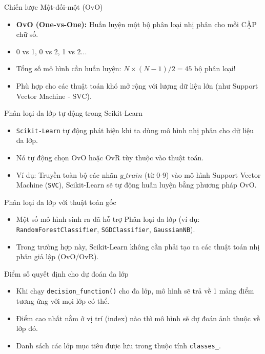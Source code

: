 \documentclass[aspectratio=169]{beamer}
\begin{document}
\begin{frame}{Chiến lược Một-đối-một (OvO)}
\begin{itemize}
    \item \textbf{OvO (One-vs-One):} Huấn luyện một bộ phân loại nhị phân cho mỗi CẶP chữ số.
    \item 0 vs 1, 0 vs 2, 1 vs 2...
    \item Tổng số mô hình cần huấn luyện: $N \times (N-1) / 2 = 45$ bộ phân loại!
    \item Phù hợp cho các thuật toán khó mở rộng với lượng dữ liệu lớn (như Support Vector Machine - SVC).
\end{itemize}
\end{frame}

\begin{frame}{Phân loại đa lớp tự động trong Scikit-Learn}
\begin{itemize}
    \item \texttt{Scikit-Learn} tự động phát hiện khi ta dùng mô hình nhị phân cho dữ liệu đa lớp.
    \item Nó tự động chọn OvO hoặc OvR tùy thuộc vào thuật toán.
    \item Ví dụ: Truyền toàn bộ các nhãn $y\_train$ (từ 0-9) vào mô hình Support Vector Machine (\texttt{SVC}), Scikit-Learn sẽ tự động huấn luyện bằng phương pháp OvO.
\end{itemize}
\end{frame}

\begin{frame}{Phân loại đa lớp với thuật toán gốc}
\begin{itemize}
    \item Một số mô hình sinh ra đã hỗ trợ Phân loại đa lớp (ví dụ: \texttt{RandomForestClassifier}, \texttt{SGDClassifier}, \texttt{GaussianNB}).
    \item Trong trường hợp này, Scikit-Learn không cần phải tạo ra các thuật toán nhị phân giả lập (OvO/OvR).
\end{itemize}
\end{frame}

\begin{frame}{Điểm số quyết định cho dự đoán đa lớp}
\begin{itemize}
    \item Khi chạy \texttt{decision\_function()} cho đa lớp, mô hình sẽ trả về 1 mảng điểm tương ứng với mọi lớp có thể.
    \item Điểm cao nhất nằm ở vị trí (index) nào thì mô hình sẽ dự đoán ảnh thuộc về lớp đó.
    \item Danh sách các lớp mục tiêu được lưu trong thuộc tính \texttt{classes\_}.
\end{itemize}
\end{frame}
\end{document}
